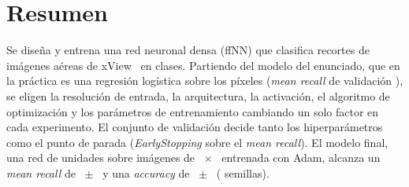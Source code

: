 \section*{Resumen}
Se diseña y entrena una red neuronal densa (ffNN) que clasifica recortes de imágenes aéreas de xView~\cite{xview} en
 clases. Partiendo del modelo del enunciado, que en la práctica es una regresión logística sobre los
píxeles (\emph{mean recall} de validación ), se eligen la resolución de entrada, la
arquitectura, la activación, el algoritmo de optimización y los parámetros de entrenamiento cambiando un solo factor
en cada experimento. El conjunto de validación decide tanto los hiperparámetros como el punto de parada
(\emph{EarlyStopping} sobre el \emph{mean recall}). El modelo final, una red de  unidades sobre
imágenes de ~$\times$~ entrenada con Adam, alcanza un \emph{mean recall} de
~$\pm$~ y una \emph{accuracy} de
~$\pm$~ ( semillas).
